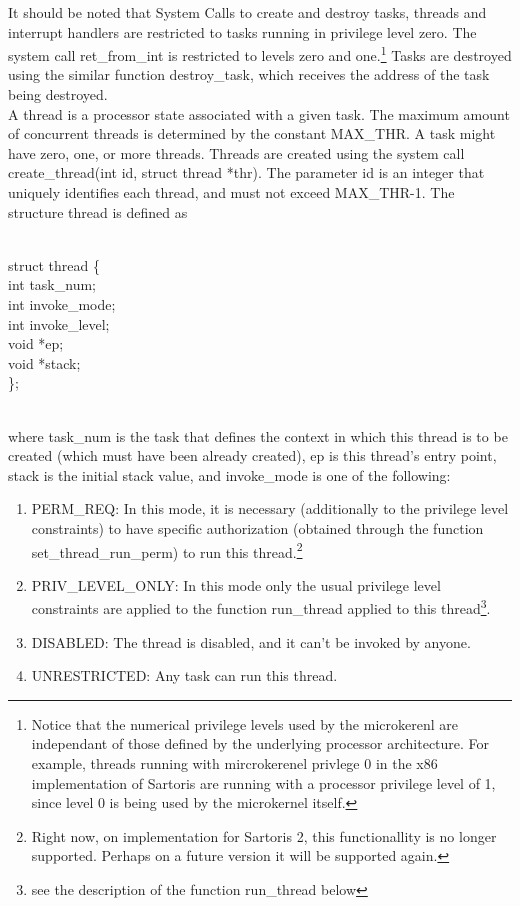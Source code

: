 \documentclass[11pt, letterpaper, twoside, english]{book}
\begin{document}
It should be noted that System Calls to create and destroy tasks, threads and interrupt handlers are restricted to tasks running in privilege level zero. The system call \textsf{ret\_from\_int} is restricted to levels zero and one.\footnote{Notice that the numerical privilege levels used by the microkerenl are independant of those defined by the underlying processor architecture. For example, threads running with mircrokerenel privlege 0 in the x86 implementation of Sartoris are running with a processor privilege level of 1, since level 0 is being used by the microkernel itself.}
Tasks are destroyed using the similar function \textsf{destroy\_task}, which receives the address of the task being destroyed.\\

A thread is a processor state associated with a given task. The maximum amount of concurrent threads is determined by the constant \textsf{MAX\_THR}. A task might have zero, one, or more threads. Threads are created using the system call \textsf{create\_thread(int id, struct thread *thr)}. The parameter \textsf{id} is an integer that uniquely identifies each thread, and must not exceed \textsf{MAX\_THR}-1. The structure \textsf{thread} is defined as \\
\\
\begin{sf} \noindent struct thread \{ \\
\indent  int task\_num; \\
\indent  int invoke\_mode; \\
\indent  int invoke\_level; \\
\indent  void *ep; \\
\indent  void *stack; \\
\}; \\
\end{sf}
\\
where \textsf{task\_num} is the task that defines the context in which this thread is to be created (which must have been already created), \textsf{ep} is this thread's entry point, \textsf{stack} is the initial stack value, and \textsf{invoke\_mode} is one of the following:
\begin{enumerate}
\item[] \textsf{PERM\_REQ}: In this mode, it is necessary (additionally to the privilege level constraints) to have specific authorization (obtained through the function \textsf{set\_thread\_run\_perm}) to run this thread.\footnote{Right now, on implementation for Sartoris 2, this functionallity is no longer supported. Perhaps on a future version it will be supported again.}
\item[] \textsf{PRIV\_LEVEL\_ONLY}: In this mode only the usual privilege level constraints are applied to the function \textsf{run\_thread} applied to this thread\footnote{see the description of the function \textsf{run\_thread} below}.
\item[] \textsf{DISABLED}: The thread is disabled, and it can't be invoked by anyone.
\item[] \textsf{UNRESTRICTED}: Any task can run this thread.
\end{enumerate}
\end{document}
